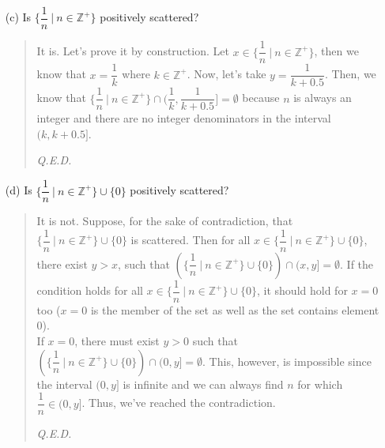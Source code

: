 \documentclass[12pt, a4paper]{article}                      %
\begin{document}
\begin{itemize}
\begin{itemize}
\item[]

\item[(c)]
Is $\{\dfrac{1}{n} \ | \ n \in \mathbb{Z}^+\}$ positively scattered?
\begin{quote}
It is. Let's prove it by construction. Let $x \in \{\dfrac{1}{n} \ | \ n \in \mathbb{Z}^+\}$, then
we know that $x = \dfrac{1}{k}$ where $k \in \mathbb{Z}^+$. Now, let's take $y = \dfrac{1}{k + 0.5}$.
Then, we know that $\{\dfrac{1}{n} \ | \ n \in \mathbb{Z}^+\} \cap (\dfrac{1}{k}, \dfrac{1}{k + 0.5}] = \emptyset$
because $n$ is always an integer and there are no integer denominators in the interval $(k, k + 0.5]$.
\begin{flushright}
\textit{Q.E.D.}
\end{flushright}
\end{quote}

\item[]

\item[(d)]
Is $\{\dfrac{1}{n} \ | \ n \in \mathbb{Z}^+\} \cup \{0\}$ positively scattered? 
\begin{quote}
It is not. Suppose, for the sake of contradiction, that $\{\dfrac{1}{n} \ | \ n \in \mathbb{Z}^+\} \cup \{0\}$
is scattered. Then for all $x \in \{\dfrac{1}{n} \ | \ n \in \mathbb{Z}^+\} \cup \{0\}$, there exist
$y > x$, such that $(\{\dfrac{1}{n} \ | \ n \in \mathbb{Z}^+\} \cup \{0\}) \cap (x,y] = \emptyset$.
If the condition holds for all $x \in \{\dfrac{1}{n} \ | \ n \in \mathbb{Z}^+\} \cup \{0\}$, it should hold
for $x = 0$ too ($x = 0$ is the member of the set as well as the set contains element 0).\\
If $x = 0$, there must exist $y > 0$ such that $(\{\dfrac{1}{n} \ | \ n \in \mathbb{Z}^+\} \cup \{0\}) \cap (0,y] = \emptyset$.
This, however, is impossible since the interval $(0, y]$ is infinite and we can always find $n$ for which
$\dfrac{1}{n} \in (0, y]$. Thus, we've reached the contradiction.
\begin{flushright}
\textit{Q.E.D.}
\end{flushright}
\end{quote}

\item[]


\end{itemize}
\end{itemize}
\end{document}

